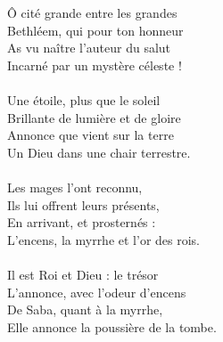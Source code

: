 Ô cité grande entre les grandes\\
Bethléem, qui pour ton honneur\\
As vu naître l'auteur du salut\\
Incarné par un mystère céleste !\\
\\
Une étoile, plus que le soleil\\
Brillante de lumière et de gloire\\
Annonce que vient sur la terre\\
Un Dieu dans une chair terrestre.\\
\\
Les mages l'ont reconnu,\\
Ils lui offrent leurs présents,\\
En arrivant, et prosternés :\\
L'encens, la myrrhe et l'or des rois.\\
\\
Il est Roi et Dieu : le trésor\\
L'annonce, avec l'odeur d'encens\\
De Saba, quant à la myrrhe,\\
Elle annonce la poussière de la tombe.